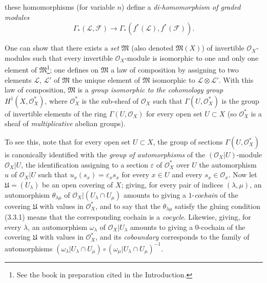 \begin{env}[5.4.6]

these homomorphisms (for variable $n$) define a
\emph{di-homomorphism of graded modules}
\[
  \Gamma_*(\mathcal{L},\mathcal{F})
  \longrightarrow
  \Gamma_*(f^*(\mathcal{L}),f^*(\mathcal{F})).
\]
\end{env}

\begin{env}[5.4.7]\label{0.5.4.7}
One can show that there exists a \emph{set} $\mathfrak{M}$ (also denoted
$\mathfrak{M}(X)$) of invertible $\mathcal{O}_X$-modules such that every
invertible $\mathcal{O}_X$-module is isomorphic to one and only one element of
$\mathfrak{M}$\footnote{See the book in preparation cited in
the Introduction.}; one defines on $\mathfrak{M}$ a law of composition by
assigning to two elements $\mathcal{L}$, $\mathcal{L}'$ of
$\mathfrak{M}$ the unique element of $\mathfrak{M}$ isomorphic to
$\mathcal{L}\otimes\mathcal{L}'$. With this law of
composition, $\mathfrak{M}$ is a \emph{group isomorphic to the cohomology
group} $H^1(X,\mathcal{O}_X^*)$, where $\mathcal{O}_X^*$ is the
sub-sheaf of $\mathcal{O}_X$ such that $\Gamma(U,\mathcal{O}_X^*)$ is the
group of invertible elements of the ring $\Gamma(U,\mathcal{O}_X)$ for
every open set $U\subset X$ (so $\mathcal{O}_X^*$ is a sheaf of
\emph{multiplicative} abelian groups).

To see this, note that for every open set $U\subset X$, the group of sections
$\Gamma(U,\mathcal{O}_X^*)$ is canonically identified with the \emph{group of
automorphisms} of the $(\mathcal{O}_X|U)$-module $\mathcal{O}_X|U$,
the identification assigning to a section $\varepsilon$ of
$\mathcal{O}_X^*$ over $U$ the automorphism $u$ of $\mathcal{O}_X|U$
such that $u_x(s_x)=\varepsilon_xs_x$ for every $x\in U$ and every
$s_x\in\mathcal{O}_x$. Now let $\mathfrak{U}=(U_\lambda)$ be an open
covering of $X$; giving, for every pair of indices $(\lambda,\mu)$, an
automorphism $\theta_{\lambda\mu}$ of
$\mathcal{O}_X|(U_\lambda\cap U_\mu)$ amounts to giving a
$1$-\emph{cochain} of the covering $\mathfrak{U}$ with values in
$\mathcal{O}_X^*$, and to say that the $\theta_{\lambda\mu}$ satisfy the
gluing condition (3.3.1) means that the corresponding cochain is
a \emph{cocycle}. Likewise, giving, for every $\lambda$, an automorphism
$\omega_\lambda$ of $\mathcal{O}_X|U_\lambda$ amounts to giving a
$0$-cochain of the covering $\mathfrak{U}$ with values in
$\mathcal{O}_X^*$, and its \emph{coboundary} corresponds to the family of
automorphisms
$(\omega_\lambda|U_\lambda\cap U_\mu)\circ
 (\omega_\mu|U_\lambda\cap U_\mu)^{-1}$.


\end{env}
